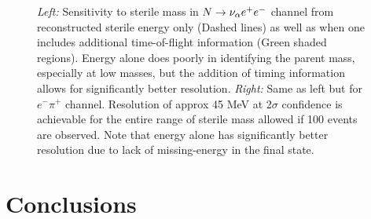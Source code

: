 \documentclass[11pt, a4paper]{article}
\def\ster{\ensuremath N}
\begin{document}
\begin{figure}[t]
\caption{\label{fig:tof_scatter}
	\emph{Left:} Sensitivity to sterile mass in $\ster \rightarrow \nu_\alpha e^+ e^-$ channel from reconstructed sterile energy only (Dashed lines) as well as
when one includes additional time-of-flight information (Green shaded regions).
Energy alone does poorly in identifying the parent mass, especially at low masses, but the addition of timing information allows for significantly better resolution.
\emph{Right:} Same as left but for $e^- \pi^+$ channel. Resolution of approx 45 MeV at 2$\sigma$ confidence is achievable for
the entire range of sterile mass allowed if 100 events are observed. Note that energy alone has significantly better resolution due to lack of missing-energy in the final state. }

\end{figure}


\section{\label{sec:conclusions}Conclusions}
\end{document}
